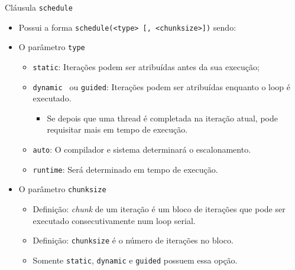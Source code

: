 	\begin{frame}{Cláusula {\tt schedule}}
		\begin{itemize}
			\item Possui a forma {\tt schedule(<type> [, <chunksize>])} sendo:

			\item O parâmetro {\tt type}
			\begin{itemize}
				\item {\tt static}: Iterações podem ser atribuídas antes da sua execução;
				\item {\tt dynamic } ou {\tt guided}: Iterações podem ser atribuídas enquanto o loop é executado.
				\begin{itemize}
					\item Se depois que uma thread é completada na iteração atual, pode requisitar mais em tempo de execução.
				\end{itemize}
				\item {\tt auto}: O compilador e sistema determinará o escalonamento.
				\item {\tt runtime}: Será determinado em tempo de execução.
			\end{itemize}
			\item O parâmetro {\tt chunksize}
			\begin{itemize}
				\item Definição: \textit{chunk} de um iteração é um bloco de iterações que pode ser executado consecutivamente num loop serial.
				\item Definição: {\tt chunksize} é o número de iterações no bloco.
				\item Somente {\tt static}, {\tt dynamic} e {\tt guided} possuem essa opção.
			\end{itemize}
		\end{itemize}
	\end{frame}

